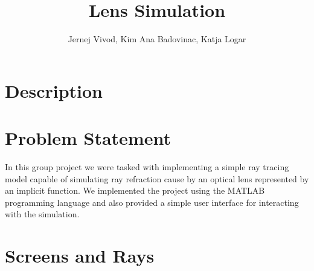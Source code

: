 \documentclass[A4]{article}
\begin{document}
\title{Lens Simulation}
\author{Jernej Vivod, Kim Ana Badovinac, Katja Logar}
\maketitle
\section{Description}

\section{Problem Statement}

In this group project we were tasked with implementing a simple ray tracing model capable of simulating ray refraction cause by an optical lens represented by an implicit function. We implemented the project using the MATLAB programming language and also provided a simple user interface for interacting with the simulation.

\section{Screens and Rays}
\end{document}
